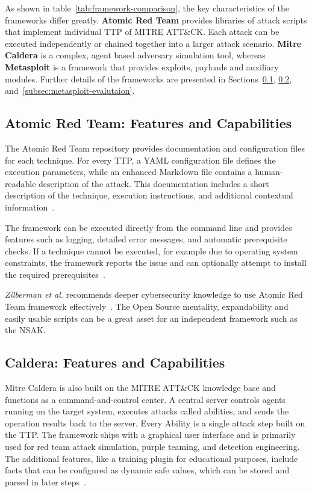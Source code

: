 As shown in table~\ref{tab:framework-comparison}, the key characteristics of the frameworks differ greatly.
\textbf{Atomic Red Team} provides libraries of attack scripts that implement individual \gls{TTP} of MITRE ATT\&CK.
Each attack can be executed independently or chained together into a larger attack scenario.
\textbf{Mitre Caldera} is a complex, agent based adversary simulation tool,
whereas \textbf{Metasploit} is a framework that provides exploits, payloads and auxiliary modules.
Further details of the frameworks are presented in Sections~\ref{subsec:atomic-red-team-evaluation}, \ref{subsec:caldera-evaluation}, and~\ref{subsec:metasploit-evalutaion}.

\subsection{Atomic Red Team: Features and Capabilities}\label{subsec:atomic-red-team-evaluation}

The Atomic Red Team repository provides documentation and configuration files for each technique.
For every TTP, a \gls{YAML} configuration file defines the execution parameters, while an enhanced Markdown file contains a human-readable description of the attack.
This documentation includes a short description of the technique, execution instructions, and additional contextual information~\cite{atomicredteam}.

The framework can be executed directly from the command line and provides features such as logging, detailed error messages, and automatic prerequisite checks.
If a technique cannot be executed, for example due to operating system constraints, the framework reports the issue and can optionally attempt to install the required prerequisites~\cite{atomicredteam}.

\textit{Zilberman et al.} recommends deeper cybersecurity knowledge to use Atomic Red Team framework effectively~\cite{Zilberman2020SoKThreatEmulators}.
The Open Source mentality, expandability and easily usable scripts can be a great asset for an independent framework such as the \gls{NSAK}.


\subsection{Caldera: Features and Capabilities}\label{subsec:caldera-evaluation}

Mitre Caldera is also built on the MITRE ATT\&CK knowledge base and functions as a command-and-control center.
A central server controls agents running on the target system, executes attacks called abilities, and sends the operation results back to the server.
Every Ability is a single attack step built on the \gls{TTP}.
The framework ships with a graphical user interface and is primarily used for red team attack simulation, purple teaming, and detection engineering.
The additional features, like a training plugin for educational purposes, include facts that can be configured as dynamic safe values, which can be stored and parsed in later steps~\cite{caldera}.

